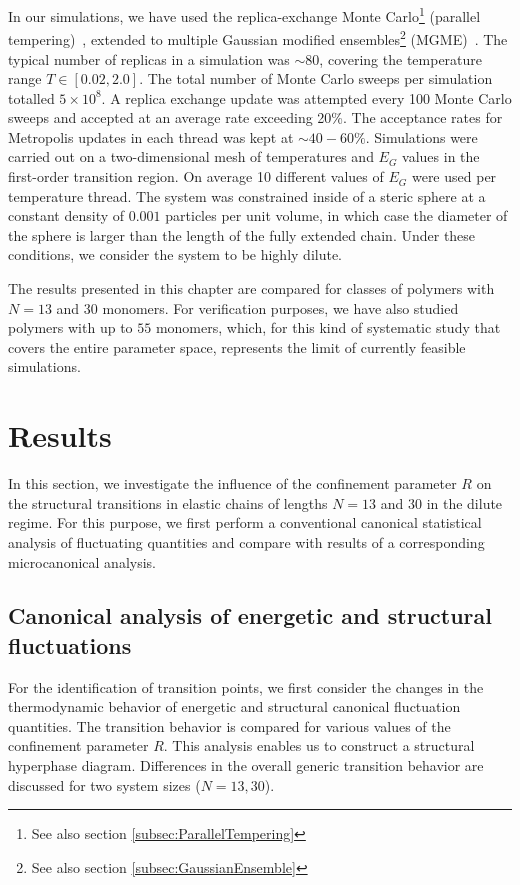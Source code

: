 \documentclass[12pt]{report}
\begin{document}
In our simulations, we have used the replica-exchange Monte Carlo\footnote{See also section\,\,\ref{subsec:ParallelTempering}} (parallel tempering)~\cite{sw1,geyer1,huku1,huku2}, extended to multiple Gaussian modified ensembles\footnote{See also section\,\,\ref{subsec:GaussianEnsemble}} (MGME)~\cite{Neuhaus2006}. The typical number of replicas in a simulation was $\sim80$, covering the temperature range $T\in [0.02,2.0]$. The total number of Monte Carlo sweeps per simulation totalled $5\times 10^8$. A replica exchange update was attempted every 100 Monte Carlo sweeps and accepted at an average rate exceeding 20\%. The acceptance rates for Metropolis updates in each thread was kept at $\sim 40-60\%$. Simulations were carried out on a two-dimensional mesh of temperatures and $E_G$ values in the first-order transition region. On average 10 different values of $E_G$ were used per temperature thread. The system was constrained inside of a steric sphere at a constant density of $0.001$ particles per unit volume, in which case the diameter of the sphere is larger than the length of the fully extended chain. Under these conditions, we consider the system to be highly dilute. 

The results presented in this chapter are compared for classes of polymers with $N=13$ and $30$ monomers. For verification purposes, we have also studied polymers with up to $55$ monomers, which, for this kind of systematic study that covers the entire parameter space, represents the limit of currently feasible simulations. 

\section{Results}
\label{sec:res}
%
In this section, we investigate the influence of the confinement parameter $R$ on the structural transitions in elastic chains of lengths $N = 13$ and $30$ in the dilute regime. For this purpose, we first perform a conventional canonical statistical analysis of fluctuating quantities and compare with results of a corresponding microcanonical analysis.
%
\subsection{Canonical analysis of energetic and structural fluctuations}
% 
For the identification of transition points, we first consider the changes in the thermodynamic behavior of energetic and structural canonical fluctuation quantities. The transition behavior is compared for various values of the confinement parameter $R$. This analysis enables us to construct a structural hyperphase diagram. Differences in the overall generic transition behavior are discussed for two system sizes ($N=13,30$). 
\end{document}
